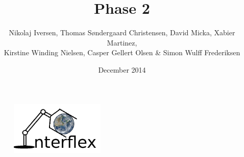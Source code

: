 \begin{titlepage}


\title{Phase 2}
\author{Nikolaj Iversen, Thomas Søndergaard Christensen, David Micka, Xabier Martinez,\\ Kirstine Winding Nielsen, Casper Gellert Olsen \& Simon Wulff Frederiksen}
\date{December 2014}

\begin{figure}[b]
\centering
\includegraphics[width=0.4\textwidth]{graphics/logo}
\end{figure}

\vfill
\end{titlepage}
\maketitle
